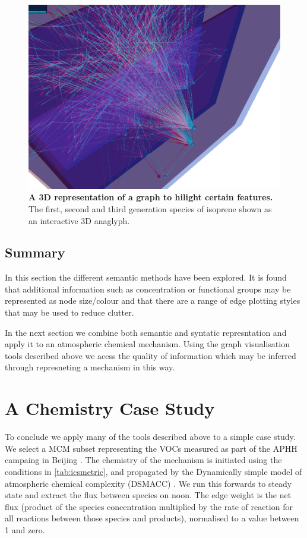 \begin{figure}[H]
     \centering
     \includegraphics[width=.6\textwidth]{figures_c1/layout/3D.png}
        \caption{\textbf{A 3D representation of a graph to hilight certain features.} The first, second and third generation species of isoprene shown as an interactive 3D anaglyph. }
      \label{fig:3D}
\end{figure}

\subsection{Summary}
In this section the different semantic methods have been explored. It is found that additional information such as concentration or functional groups may be represented as node size/colour and that there are a range of edge plotting styles that may be used to reduce clutter. 

In the next section we combine both semantic and syntatic represntation and apply it to an atmospheric chemical mechanism. Using the graph visualisation tools described above we acess the quality of information which may be inferred through represneting a mechanism in this way.


\section{A Chemistry Case Study}\label{sec:chemcase}
To conclude we apply many of the tools described above to a simple case study. We select a MCM subset representing the VOCs measured as part of the APHH campaing in Beijing \citep{aphh}. The chemistry of the mechanism is initiated using the conditions in \autoref{tab:icsmetric}, and propagated by the Dynamically simple model of atmospheric chemical complexity (DSMACC) \citep{dsmacc,dsmaccgit}. We run this forwards to steady state and extract the flux between species on noon. The edge weight is the net flux (product of the species concentration multiplied by the rate of reaction for all reactions between those species and products), normalised to a value between 1 and zero. 

